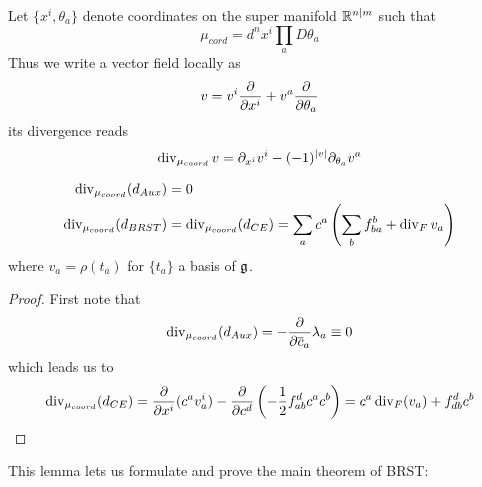\begin{rem}
  \begin{lem}
    Let $\{x^i, \theta_a\}$ denote coordinates on the super manifold $\mathbb{R}^{n|m}$ such that
    \begin{equation}
      \mu_{cord} = d^n x^i \prod_a D\theta_a
    \end{equation}
    Thus we write a vector field locally as
    \begin{equation}
      v = v^i \frac{\partial }{\partial x^i} + v^a \frac{\partial }{\partial \theta_a}
    \end{equation}
    its divergence reads
    \begin{equation}
      \operatorname{div}_{\mu_{coord}} v = \partial_{x^i} v^i - (-1)^{|v|} \partial_{\theta_a} v^a
    \end{equation}
  \end{lem}
\end{rem}

\begin{lem}
  \begin{align}
    \operatorname{div}_{\mu_{coord}} (d_{Aux}) &= 0 \\
    \operatorname{div}_{\mu_{coord}} (d_{BRST}) &= \operatorname{div}_{\mu_{coord}} (d_{CE}) = \sum_a c^a \left( \sum_b f^b_{ba} + \operatorname{div}_F v_a \right)
  \end{align}
  where $v_a = \rho(t_a)$ for $\{t_a\}$ a basis of $\mathfrak{g}$.
\begin{proof}
  First note that
  \begin{equation}\operatorname{div}_{\mu_{coord}} (d_{Aux}) = - \frac{\partial }{\partial \overline{c}_a} \lambda_a \equiv 0 \end{equation}
  which leads us to
  \begin{equation}\operatorname{div}_{\mu_{coord}} (d_{CE}) = \frac{\partial }{\partial x^i} (c^a v_a^i) - \frac{\partial }{\partial c^d} \left(- \frac{1}{2} f^d_{ab}c^a c^b\right) = c^a \operatorname{div}_F (v_a) + f^d_{db}c^b \end{equation}
\end{proof}
\end{lem}

This lemma lets us formulate and prove the main theorem of BRST:


